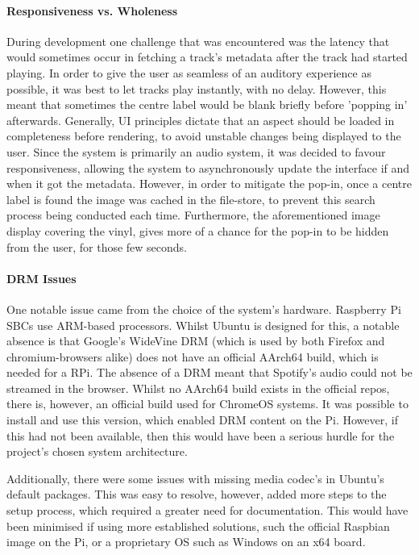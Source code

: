                 \paragraph{Responsiveness vs. Wholeness} During development one challenge that was encountered was the latency that would sometimes occur in fetching a track's metadata after the track had started playing. In order to give the user as seamless of an auditory experience as possible, it was best to let tracks play instantly, with no delay. However, this meant that sometimes the centre label would be blank briefly before 'popping in' afterwards. Generally, UI principles dictate that an aspect should be loaded in completeness before rendering, to avoid unstable changes being displayed to the user. Since the system is primarily an audio system, it was decided to favour responsiveness, allowing the system to asynchronously update the interface if and when it got the metadata. However, in order to mitigate the pop-in, once a centre label is found the image was cached in the file-store, to prevent this search process being conducted each time. Furthermore, the aforementioned image display covering the vinyl, gives more of a chance for the pop-in to be hidden from the user, for those few seconds.
    
                \paragraph{DRM Issues} One notable issue came from the choice of the system's hardware. Raspberry Pi SBCs use ARM-based processors. Whilst Ubuntu is designed for this, a notable absence is that Google's WideVine DRM (which is used by both Firefox and chromium-browsers alike) does not have an official AArch64 build, which is needed for a RPi. The absence of a DRM meant that Spotify's audio could not be streamed in the browser. Whilst no AArch64 build exists in the official repos, there is, however, an official build used for ChromeOS systems. It was possible to install and use this version, which enabled DRM content on the Pi. However, if this had not been available, then this would have been a serious hurdle for the project's chosen system architecture.
    
                Additionally, there were some issues with missing media codec's in Ubuntu's default packages. This was easy to resolve, however, added more steps to the setup process, which required a greater need for documentation. This would have been minimised if using more established solutions, such the official Raspbian image on the Pi, or a proprietary OS such as Windows on an x64 board.
    
